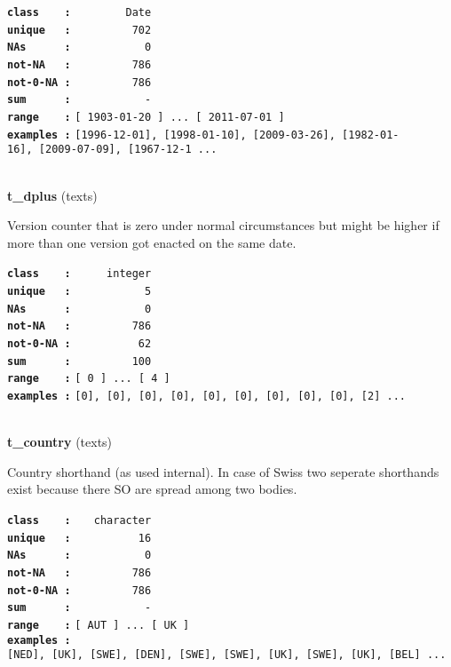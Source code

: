 \documentclass[]{article}
\begin{document}
\textbf{\texttt{class\ \ \ \ :}} \texttt{~~~~~~~~Date}\\
\textbf{\texttt{unique\ \ \ :}} \texttt{~~~~~~~~~702}\\
\textbf{\texttt{NAs\ \ \ \ \ \ :}} \texttt{~~~~~~~~~~~0}\\
\textbf{\texttt{not-NA\ \ \ :}} \texttt{~~~~~~~~~786}\\
\textbf{\texttt{not-0-NA\ :}} \texttt{~~~~~~~~~786}\\
\textbf{\texttt{sum\ \ \ \ \ \ :}} \texttt{~~~~~~~~~~~-}\\
\textbf{\texttt{range\ \ \ \ :}}
\texttt{{[}\ 1903-01-20\ {]}\ ...\ {[}\ 2011-07-01\ {]}}\\
\textbf{\texttt{examples\ :}}
\texttt{{[}1996-12-01{]},\ {[}1998-01-10{]},\ {[}2009-03-26{]},\ {[}1982-01-16{]},\ {[}2009-07-09{]},\ {[}1967-12-1\ ...}\\

~

\textbf{t\_dplus} (texts)

Version counter that is zero under normal circumstances but might be
higher if more than one version got enacted on the same date.

\textbf{\texttt{class\ \ \ \ :}} \texttt{~~~~~integer}\\
\textbf{\texttt{unique\ \ \ :}} \texttt{~~~~~~~~~~~5}\\
\textbf{\texttt{NAs\ \ \ \ \ \ :}} \texttt{~~~~~~~~~~~0}\\
\textbf{\texttt{not-NA\ \ \ :}} \texttt{~~~~~~~~~786}\\
\textbf{\texttt{not-0-NA\ :}} \texttt{~~~~~~~~~~62}\\
\textbf{\texttt{sum\ \ \ \ \ \ :}} \texttt{~~~~~~~~~100}\\
\textbf{\texttt{range\ \ \ \ :}}
\texttt{{[}\ 0\ {]}\ ...\ {[}\ 4\ {]}}\\
\textbf{\texttt{examples\ :}}
\texttt{{[}0{]},\ {[}0{]},\ {[}0{]},\ {[}0{]},\ {[}0{]},\ {[}0{]},\ {[}0{]},\ {[}0{]},\ {[}0{]},\ {[}2{]}\ ...}\\

~

\textbf{t\_country} (texts)

Country shorthand (as used internal). In case of Swiss two seperate
shorthands exist because there SO are spread among two bodies.

\textbf{\texttt{class\ \ \ \ :}} \texttt{~~~character}\\
\textbf{\texttt{unique\ \ \ :}} \texttt{~~~~~~~~~~16}\\
\textbf{\texttt{NAs\ \ \ \ \ \ :}} \texttt{~~~~~~~~~~~0}\\
\textbf{\texttt{not-NA\ \ \ :}} \texttt{~~~~~~~~~786}\\
\textbf{\texttt{not-0-NA\ :}} \texttt{~~~~~~~~~786}\\
\textbf{\texttt{sum\ \ \ \ \ \ :}} \texttt{~~~~~~~~~~~-}\\
\textbf{\texttt{range\ \ \ \ :}}
\texttt{{[}\ AUT\ {]}\ ...\ {[}\ UK\ {]}}\\
\textbf{\texttt{examples\ :}}
\texttt{{[}NED{]},\ {[}UK{]},\ {[}SWE{]},\ {[}DEN{]},\ {[}SWE{]},\ {[}SWE{]},\ {[}UK{]},\ {[}SWE{]},\ {[}UK{]},\ {[}BEL{]}\ ...}\\
\end{document}
